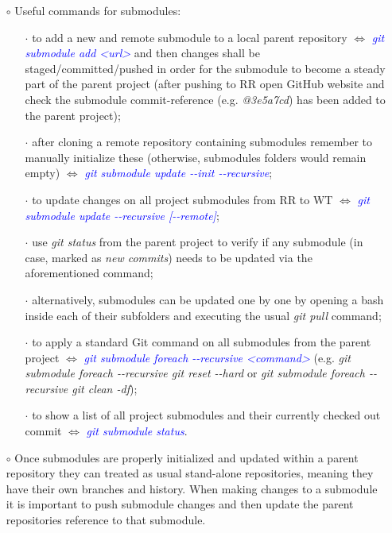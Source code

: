 \documentclass[a4paper,portrait,10pt]{article}   %
\newcommand{\mybulletlvA}{$\circ$}   %
\newcommand{\mybulletlvB}{$\cdot$}   %
\newcommand{\mydiv}{$\Leftrightarrow$ }   %
\newcommand{\mycmd}[1]{\textcolor{blue}{\textit{#1}}}   %
\newcommand{\myparvspace}{\vspace{4mm}}   %
\begin{document}
\begin{itemize}
\item[\mybulletlvA] Useful commands for submodules:
\begin{itemize}
  \item[\mybulletlvB] to add a new and remote submodule to a local parent repository \mydiv \mycmd{git submodule add <url>} and then changes shall be staged/committed/pushed in order for the submodule to become a steady part of the parent project (after pushing to RR open GitHub website and check the submodule commit-reference (e.g. \textit{@3e5a7cd}) has been added to the parent project);
  \item[\mybulletlvB] after cloning a remote repository containing submodules remember to manually initialize these (otherwise, submodules folders would remain empty) \mydiv \mycmd{git submodule update -{}-init -{}-recursive};
  \item[\mybulletlvB] to update changes on all project submodules from RR to WT \mydiv \mycmd{git submodule update -{}-recursive [-{}-remote]};
  \item[\mybulletlvB] use \textit{git status} from the parent project to verify if any submodule (in case, marked as \textit{new commits}) needs to be updated via the aforementioned command;
  \item[\mybulletlvB] alternatively, submodules can be updated one by one by opening a bash inside each of their subfolders and executing the usual \textit{git pull} command;
  \item[\mybulletlvB] to apply a standard Git command on all submodules from the parent project \mydiv \mycmd{git submodule foreach -{}-recursive <command>} (e.g. \textit{git submodule foreach -{}-recursive git reset -{}-hard} or \textit{git submodule foreach -{}-recursive git clean -df});
  \item[\mybulletlvB] to show a list of all project submodules and their currently checked out commit \mydiv \mycmd{git submodule status}.
\end{itemize}
\myparvspace

\item[\mybulletlvA] Once submodules are properly initialized and updated within a parent repository they can treated as usual stand-alone repositories, meaning they have their own branches and history. When making changes to a submodule it is important to push submodule changes and then update the parent repositories reference to that submodule.
\myparvspace


\end{itemize}
\end{document}
